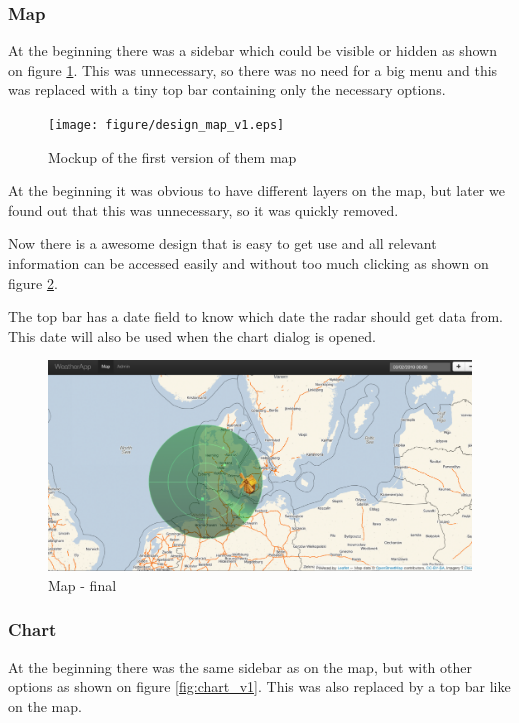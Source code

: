 \subsubsection{Map}
\label{sec:map}
At the beginning there was a sidebar which could be visible or hidden as shown on figure \ref{fig:map_v1}. This was unnecessary, so there was no need for a big menu and this was replaced with a tiny top bar containing only the necessary options.

\begin{figure}[htbp]
   \centering
   \texttt{[image: figure/design\_map\_v1.eps]}
   \caption{Mockup of the first version of them map}
   \label{fig:map_v1}
\end{figure}

At the beginning it was obvious to have different layers on the map, but later we found out that this was unnecessary, so it was quickly removed.

Now there is a awesome design that is easy to get use and all relevant information can be accessed easily and without too much clicking as shown on figure \ref{fig:map_final}.

The top bar has a date field to know which date the radar should get data from. This date will also be used when the chart dialog is opened.

\begin{figure}[htbp]
   \centering
   \includegraphics[width=1\linewidth]{figure/design_map_final.eps}
   \caption{Map - final}
   \label{fig:map_final}
\end{figure}

\subsubsection{Chart}
At the beginning there was the same sidebar as on the map, but with other options as shown on figure \ref{fig:chart_v1}. This was also replaced by a top bar like on the map.

